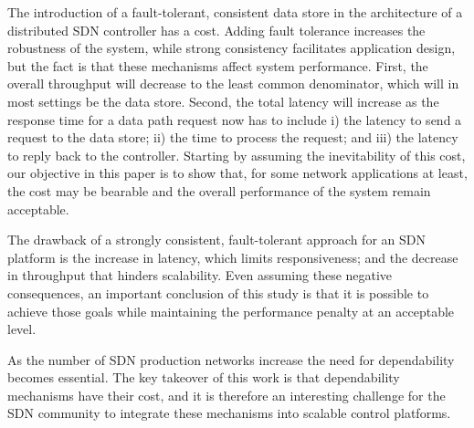 The introduction of a fault-tolerant, consistent data store in the architecture of a distributed SDN controller has a cost.
Adding fault tolerance increases the robustness of the system, while strong consistency facilitates application design, but the fact is that these mechanisms affect system performance.
First, the overall throughput will decrease to the least common denominator, which will in most settings be the data store.
Second, the total latency will increase as the response time for a data path request now has to include i) the latency to send a request to the data store; ii) the time to process the request; and iii) the latency to reply back to the controller.
Starting by assuming the inevitability of this cost, our objective in this paper is to show that, for some network applications at least, the cost may be bearable and the overall performance of the system remain acceptable.


The drawback of a strongly consistent, fault-tolerant approach for an SDN platform is the increase in latency, which limits responsiveness; and the decrease in throughput that hinders scalability.
Even assuming these negative consequences, an important conclusion of this study is that it is possible to achieve those goals while maintaining the performance penalty at an acceptable level.

As the number of SDN production networks increase the need for dependability becomes essential. The key takeover of this work is that dependability mechanisms have their cost, and it is therefore an interesting challenge for the SDN community to integrate these mechanisms into scalable control platforms. 

